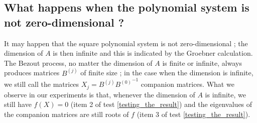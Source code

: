 \documentclass{standalone}
\begin{document}
\subsection{What happens when the polynomial system is not zero-dimensional ?}
It may happen that the square polynomial system is not zero-dimensional ; the dimension of $A$ is then infinite and this is indicated by the Groebner calculation. The Bezout process, no matter the dimension of $A$ is finite or infinite, always produces matrices $B^{(j)}$ of finite size ; in the case when the dimension is infinite, we still call the matrices $X_j = B^{(j)}{B^{(0)}}^{-1}$ companion matrices.
What we observe in our experiments is that, whenever the dimension of $A$ is infinite,  we still have $f(X) = 0$ (item 2 of test \ref{testing_the_result}) and the eigenvalues of the companion matrices are still roots of $f$ (item 3 of test \ref{testing_the_result}).
\end{document}
